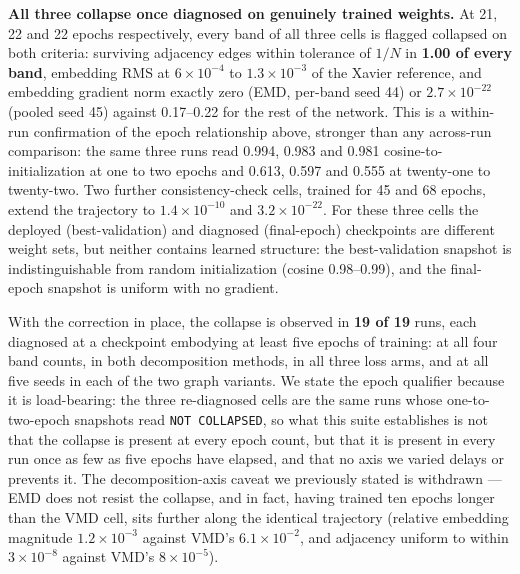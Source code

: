 \documentclass[journal]{IEEEtran}
\begin{document}
\textbf{All three collapse once diagnosed on genuinely trained weights.} At 21,
22 and 22 epochs respectively, every band of all three cells is flagged collapsed
on both criteria: surviving adjacency edges within tolerance of $1/N$ in
\textbf{1.00 of every band}, embedding RMS at $6\times10^{-4}$ to $1.3\times10^{-3}$
of the Xavier reference, and embedding gradient norm exactly zero (EMD, per-band
seed 44) or $2.7\times10^{-22}$ (pooled seed 45) against 0.17--0.22 for the rest
of the network. This is a within-run confirmation of the epoch relationship
above, stronger than any across-run comparison: the same three runs read 0.994,
0.983 and 0.981 cosine-to-initialization at one to two epochs and 0.613, 0.597
and 0.555 at twenty-one to twenty-two. Two further consistency-check cells,
trained for 45 and 68 epochs, extend the trajectory to $1.4\times10^{-10}$ and
$3.2\times10^{-22}$. For these three cells the deployed (best-validation) and
diagnosed (final-epoch) checkpoints are different weight sets, but neither
contains learned structure: the best-validation snapshot is indistinguishable
from random initialization (cosine 0.98--0.99), and the final-epoch snapshot is
uniform with no gradient.

With the correction in place, the collapse is observed in \textbf{19 of 19}
runs, each diagnosed at a checkpoint embodying at least five epochs of training:
at all four band counts, in both decomposition methods, in all three loss arms,
and at all five seeds in each of the two graph variants. We state the epoch
qualifier because it is load-bearing: the three re-diagnosed cells are the same
runs whose one-to-two-epoch snapshots read \texttt{NOT COLLAPSED}, so what this
suite establishes is not that the collapse is present at every epoch count, but
that it is present in every run once as few as five epochs have elapsed, and that
no axis we varied delays or prevents it. The
decomposition-axis caveat we previously stated is withdrawn --- EMD does not
resist the collapse, and in fact, having trained ten epochs longer than the VMD
cell, sits further along the identical trajectory (relative embedding magnitude
$1.2\times10^{-3}$ against VMD's $6.1\times10^{-2}$, and adjacency uniform to
within $3\times10^{-8}$ against VMD's $8\times10^{-5}$).
\end{document}
